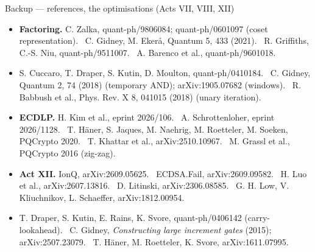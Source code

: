 \documentclass[aspectratio=169,11pt]{beamer}
\begin{document}
\begin{frame}{Backup --- references, the optimisations (Acts VII, VIII, XII)}
  \footnotesize
  \begin{itemize}\setlength{\itemsep}{1.1mm}
    \item \textbf{Factoring.} C. Zalka, quant-ph/9806084; quant-ph/0601097 (coset representation). \ C. Gidney, M. Ekerå, Quantum 5, 433 (2021). \ R. Griffiths, C.-S. Niu, quant-ph/9511007. \ A. Barenco et al., quant-ph/9601018.
    \item S. Cuccaro, T. Draper, S. Kutin, D. Moulton, quant-ph/0410184. \ C. Gidney, Quantum 2, 74 (2018) (temporary AND); arXiv:1905.07682 (windows). \ R. Babbush et al., Phys. Rev. X 8, 041015 (2018) (unary iteration).
    \item \textbf{ECDLP.} H. Kim et al., eprint 2026/106. \ A. Schrottenloher, eprint 2026/1128. \ T. Häner, S. Jaques, M. Naehrig, M. Roetteler, M. Soeken, PQCrypto 2020. \ T. Khattar et al., arXiv:2510.10967. \ M. Grassl et al., PQCrypto 2016 (zig-zag).
    \item \textbf{Act XII.} IonQ, arXiv:2609.05625. \ ECDSA.Fail, arXiv:2609.09582. \ H. Luo et al., arXiv:2607.13816. \ D. Litinski, arXiv:2306.08585. \ G. H. Low, V. Kliuchnikov, L. Schaeffer, arXiv:1812.00954.
    \item T. Draper, S. Kutin, E. Rains, K. Svore, quant-ph/0406142 (carry-lookahead). \ C. Gidney, \emph{Constructing large increment gates} (2015); arXiv:2507.23079. \ T. Häner, M. Roetteler, K. Svore, arXiv:1611.07995.
  \end{itemize}
\end{frame}
\end{document}
